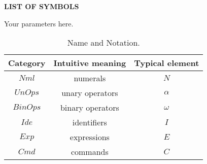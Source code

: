 




\begin{center}
	{\LARGE{\bf{LIST OF SYMBOLS}}}\\
\end{center}


Your parameters here.

\begin{table}[htpb]
	\caption{Name and Notation.}
	\begin{center}
		\begin{tabular}{|c|c|c|}\hline
			Category & Intuitive meaning & Typical element \\ \hline
			\hline
			$\mathit{Nml}$ & numerals & $N$ \\ \hline
			$\mathit{UnOps}$ & unary operators & $\alpha$ \\ \hline
			$\mathit{BinOps}$ & binary operators & $\omega$ \\ \hline
			$\mathit{Ide}$ & identifiers & $I$ \\ \hline
			$\mathit{Exp}$ & expressions & $E$ \\ \hline
			$\mathit{Cmd}$ & commands & $C$ \\ \hline
		\end{tabular}
	\end{center}
\end{table}